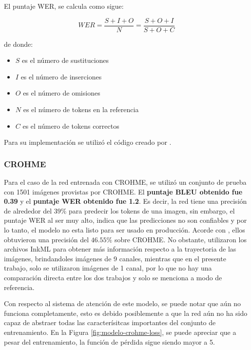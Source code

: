 El puntaje WER, se calcula como sigue:

\begin{equation}
    WER = \frac{S + I + O}{N} = \frac{S + O + I}{S + O + C}
\end{equation}

de donde:

\begin{itemize}
    \item $S$ es el número de sustituciones
    \item $I$ es el número de inserciones
    \item $O$ es el número de omisiones
    \item $N$ es el número de tokens en la referencia
    \item $C$ es el número de tokens correctos
\end{itemize}

Para su implementación se utilizó el código creado por \cite{wer-implementation}.

\subsubsection{CROHME}

Para el caso de la red entrenada con CROHME, se utilizó un conjunto de prueba con 1501 imágenes provistas por CROHME. El \textbf{puntaje BLEU obtenido fue 0.39} y el \textbf{puntaje WER obtenido fue 1.2}. Es decir, la red tiene una precisión de alrededor del $39\%$ para predecir los tokens de una imagen, sin embargo, el puntaje WER al ser muy alto, indica que las predicciones no son confiables y por lo tanto, el modelo no esta listo para ser usado en producción. Acorde con \cite{chino}, ellos obtuvieron una precisión del $46.55\%$ sobre CROHME. No obstante, utilizaron los archivos InkML para obtener más información respecto a la trayectoria de las imágenes, brindandoles imágenes de 9 canales, mientras que en el presente trabajo, solo se utilizaron imágenes de 1 canal, por lo que no hay una comparación directa entre los dos trabajos y solo se menciona a modo de referencia.

Con respecto al sistema de atención de este modelo, se puede notar que aún no funciona completamente, esto es debido posiblemente a que la red aún no ha sido capaz de abstraer todas las caracterísitcas importantes del conjunto de entrenamiento. En la Figura \ref{fig:modelo-crohme-loss}, se puede apreciar que a pesar del entrenamiento, la función de pérdida sigue siendo mayor a 5.


